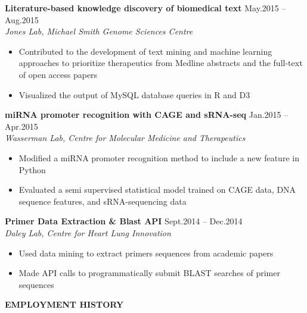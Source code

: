 \documentclass{res}
\renewcommand{\section}[1]{%
  \vspace{0.3in}%
  \centerline{\uppercase{\bf{#1}}}%
  \vspace{-6pt}}
\newcommand{\linehead}[2]{%
  {\bf #1} \hfill #2\\}
\newcommand{\linetitle}[1]{%
  {\sl #1}}
\begin{document}
\begin{resume}
\linehead{Literature-based knowledge discovery of biomedical text}{May.2015 -- Aug.2015}
\linetitle{Jones Lab, Michael Smith Genome Sciences Centre}
\begin{itemize}
  \item Contributed to the development of text mining and machine learning approaches to prioritize therapeutics from Medline abstracts and the full-text of open access papers
  \item Visualized the output of MySQL database queries in R and D3
\end{itemize}

\linehead{miRNA promoter recognition with CAGE and sRNA-seq}{Jan.2015 -- Apr.2015}
\linetitle{Wasserman Lab, Centre for Molecular Medicine and Therapeutics}
\begin{itemize}
  \item Modified a miRNA promoter recognition method to include a new feature in Python
  \item Evaluated a semi supervised statistical model trained on CAGE data, DNA sequence features, and sRNA-sequencing data
\end{itemize}

\linehead{Primer Data Extraction \& Blast API}{Sept.2014 -- Dec.2014}
\linetitle{Daley Lab, Centre for Heart Lung Innovation}
\begin{itemize}
  \item Used data mining to extract primers sequences from academic papers
  \item Made API calls to programmatically submit BLAST searches of primer sequences
\end{itemize}

\section{Employment history}


\end{resume}
\end{document}
